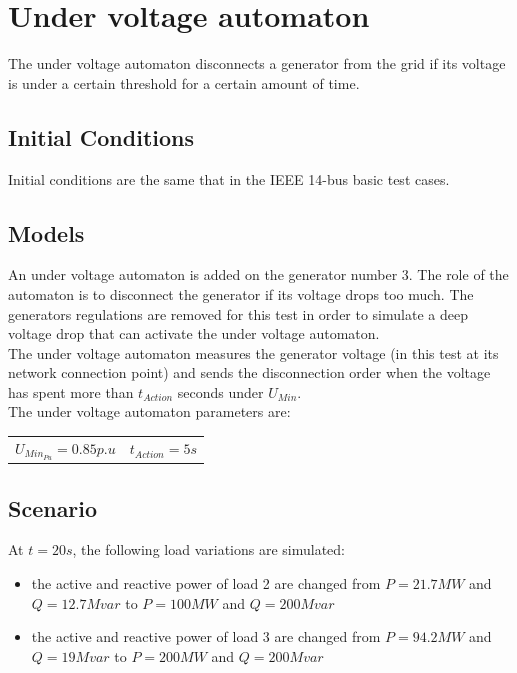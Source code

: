 \documentclass[a4paper, 12pt]{report}
\begin{document}
\newpage
\section{Under voltage automaton}
\label{UnderVoltageAutomaton}

The under voltage automaton disconnects a generator from the grid if its voltage is under a certain threshold for a certain amount of time.

\subsection{Initial Conditions}

Initial conditions are the same that in the IEEE 14-bus basic test cases.

\subsection{Models}

An under voltage automaton is added on the generator number 3. The role of the automaton is to disconnect the generator if its voltage drops too much. The generators regulations are removed for this test in order to simulate a deep voltage drop that can activate the under voltage automaton.\\

The under voltage automaton measures the generator voltage (in this test at its network connection point) and sends the disconnection order when the voltage has spent more than $t_{Action}$ seconds under $U_{Min}$.\\

The under voltage automaton parameters are:
\begin{center}
\begin{tabular}{l|l}
   $U_{Min_{Pu}}=0.85p.u$ & $t_{Action}=5s$  \\
\end{tabular}
\end{center}

\subsection{Scenario}
At $t=20s$, the following load variations are simulated:
\begin{itemize}
\item{the active and reactive power of load 2 are changed from $P=21.7MW$ and $Q=12.7Mvar$ to $P=100MW$ and $Q=200Mvar$}
\item{the active and reactive power of load 3 are changed from $P=94.2MW$ and $Q=19Mvar$ to $P=200MW$ and $Q=200Mvar$}
\end{itemize}
\end{document}
